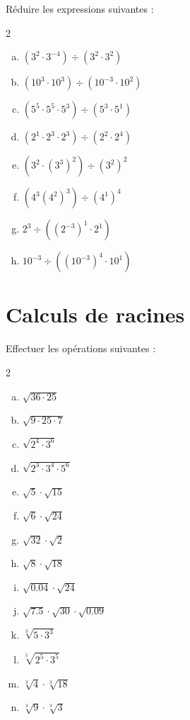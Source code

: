 \documentclass[twoside, a4paper, 12pt, openright, fullpage]{book}
\begin{document}
\begin{exercice}\label{puissances3}
Réduire les expressions suivantes :
\begin{multicols}{2}
\begin{enumerate}[a)]
    \item $\left(3^2 \cdot 3^{-4}\right) \div \left(3^2\cdot 3^2\right)$
    \item $\left(10^3 \cdot 10^3 \right) \div \left(10^{-3}\cdot 10^2\right)$
    \item $\left(5^5 \cdot 5^5 \cdot 5^3\right) \div \left(5^3\cdot 5^1\right)$
    \item $\left(2^1 \cdot 2^3 \cdot 2^3\right) \div \left( 2^2 \cdot 2^4 \right)$
    \item $\left(3^2 \cdot \left(3^3\right)^2\right) \div \left(3^2\right)^2$
    \item $\left(4^3\left(4^2\right)^3\right) \div \left(4^1\right)^4$
    \item $2^3 \div \left(\left(2^{-3}\right)^1 \cdot 2^1\right)$
    \item $10^{-3} \div \left(\left(10^{-3}\right)^4 \cdot 10^1\right)$
    \end{enumerate}
\end{multicols}
\end{exercice}

\section{Calculs de racines}

\begin{exercice}\label{racines1}
Effectuer les opérations suivantes :
\begin{multicols}{2}
\begin{enumerate}[a)]
    \item $\sqrt{36 \cdot 25}$
    \item $\sqrt{9\cdot 25 \cdot 7}$
    \item $\sqrt{2^4 \cdot 3^6}$
    \item $\sqrt{2^3 \cdot 3^4 \cdot 5^6}$
    \item $\sqrt{5}\cdot \sqrt{15}$
    \item $\sqrt{6}\cdot \sqrt{24}$
    \item $\sqrt{32}\cdot \sqrt{2}$
    \item $\sqrt{8}\cdot \sqrt{18}$
    \item $\sqrt{0.04} \cdot \sqrt{24}$
    \item $\sqrt{7.5}\cdot \sqrt{30} \cdot \sqrt{0.09}$
    \item $\sqrt[3]{5\cdot 3^3}$
    \item $\sqrt[5]{2^5 \cdot 3^5}$
    \item $\sqrt[3]{4} \cdot \sqrt[3]{18}$
    \item $\sqrt[3]{9}\cdot \sqrt[3]{3}$
    \end{enumerate}
\end{multicols}
\end{exercice}
\end{document}
